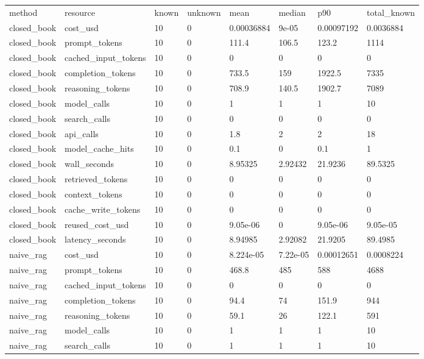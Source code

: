 \begin{tabular}{llllllll}
\hline
method & resource & known & unknown & mean & median & p90 & total\_known \\
closed\_book & cost\_usd & 10 & 0 & 0.00036884 & 9e-05 & 0.00097192 & 0.0036884 \\
closed\_book & prompt\_tokens & 10 & 0 & 111.4 & 106.5 & 123.2 & 1114 \\
closed\_book & cached\_input\_tokens & 10 & 0 & 0 & 0 & 0 & 0 \\
closed\_book & completion\_tokens & 10 & 0 & 733.5 & 159 & 1922.5 & 7335 \\
closed\_book & reasoning\_tokens & 10 & 0 & 708.9 & 140.5 & 1902.7 & 7089 \\
closed\_book & model\_calls & 10 & 0 & 1 & 1 & 1 & 10 \\
closed\_book & search\_calls & 10 & 0 & 0 & 0 & 0 & 0 \\
closed\_book & api\_calls & 10 & 0 & 1.8 & 2 & 2 & 18 \\
closed\_book & model\_cache\_hits & 10 & 0 & 0.1 & 0 & 0.1 & 1 \\
closed\_book & wall\_seconds & 10 & 0 & 8.95325 & 2.92432 & 21.9236 & 89.5325 \\
closed\_book & retrieved\_tokens & 10 & 0 & 0 & 0 & 0 & 0 \\
closed\_book & context\_tokens & 10 & 0 & 0 & 0 & 0 & 0 \\
closed\_book & cache\_write\_tokens & 10 & 0 & 0 & 0 & 0 & 0 \\
closed\_book & reused\_cost\_usd & 10 & 0 & 9.05e-06 & 0 & 9.05e-06 & 9.05e-05 \\
closed\_book & latency\_seconds & 10 & 0 & 8.94985 & 2.92082 & 21.9205 & 89.4985 \\
naive\_rag & cost\_usd & 10 & 0 & 8.224e-05 & 7.22e-05 & 0.00012651 & 0.0008224 \\
naive\_rag & prompt\_tokens & 10 & 0 & 468.8 & 485 & 588 & 4688 \\
naive\_rag & cached\_input\_tokens & 10 & 0 & 0 & 0 & 0 & 0 \\
naive\_rag & completion\_tokens & 10 & 0 & 94.4 & 74 & 151.9 & 944 \\
naive\_rag & reasoning\_tokens & 10 & 0 & 59.1 & 26 & 122.1 & 591 \\
naive\_rag & model\_calls & 10 & 0 & 1 & 1 & 1 & 10 \\
naive\_rag & search\_calls & 10 & 0 & 1 & 1 & 1 & 10 \\

\end{tabular}
